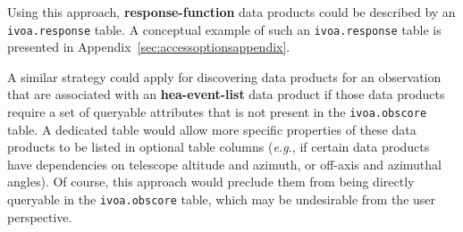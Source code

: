 Using this approach, {\bf response-function} data products could be described by an {\tt ivoa.response} table.
A conceptual example of such an  {\tt ivoa.response} table is presented in Appendix~\ref{sec:accessoptionsappendix}.

A similar strategy could apply for discovering data products for an observation that are associated with an {\bf hea-event-list} data product if those data products require a set of queryable attributes that is not present in the {\tt ivoa.obscore} table.  A dedicated table would allow more specific properties of these data products to be listed in optional table columns ({\em e.g.\/}, if certain data products have dependencies on telescope altitude and azimuth, or off-axis and azimuthal angles).  Of course, this approach would preclude them from being directly queryable in the {\tt ivoa.obscore} table, which may be undesirable from the user perspective.



